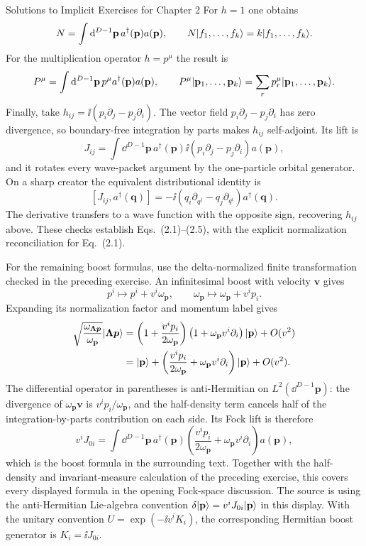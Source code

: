 \begin{bankssolutions}{Solutions to Implicit Exercises for Chapter 2}
For $h=1$ one obtains
\[
  N=\int\mathop{}\!\mathrm{d}^{D-1}\mathbf p\,a^\dagger(\mathbf p)a(\mathbf p),
  \qquad N\lvert f_1,\ldots,f_k\rangle=k\lvert f_1,\ldots,f_k\rangle.
\]
For the multiplication operator $h=p^\mu$ the result is
\[
  P^\mu=\int\mathop{}\!\mathrm{d}^{D-1}\mathbf p\,p^\mu a^\dagger(\mathbf p)a(\mathbf p),
  \qquad P^\mu\lvert \mathbf p_1,\ldots,\mathbf p_k\rangle
  =\sum_r p_r^\mu\lvert \mathbf p_1,\ldots,\mathbf p_k\rangle.
\]
Finally, take $h_{ij}=\ii(p_i\partial_j-p_j\partial_i)$. The vector field
$p_i\partial_j-p_j\partial_i$ has zero divergence, so boundary-free integration
by parts makes $h_{ij}$ self-adjoint. Its lift is
\[
  J_{ij}=\int\dd^{D-1}\mathbf p\,a^\dagger(\mathbf p)
  \ii(p_i\partial_j-p_j\partial_i)a(\mathbf p),
\]
and it rotates every wave-packet argument by the one-particle orbital
generator. On a sharp creator the equivalent distributional identity is
\[
  [J_{ij},a^\dagger(\mathbf q)]
  =-\ii(q_i\partial_{q^j}-q_j\partial_{q^i})a^\dagger(\mathbf q).
\]
The derivative transfers to a wave function with the opposite sign, recovering
$h_{ij}$ above. These checks establish Eqs.~(2.1)--(2.5), with the explicit
normalization reconciliation for Eq.~(2.1).

For the remaining boost formulas, use the delta-normalized finite
transformation checked in the preceding exercise. An infinitesimal boost with
velocity $\mathbf v$ gives
\[
  p^i\longmapsto p^i+v^i\omega_{\mathbf p},
  \qquad
  \omega_{\mathbf p}\longmapsto
  \omega_{\mathbf p}+v^i p_i.
\]
Expanding its normalization factor and momentum label gives
\begin{align*}
  \sqrt{\frac{\omega_{\boldsymbol{\Lambda p}}}{\omega_{\mathbf p}}}
  \lvert \boldsymbol{\Lambda p}\rangle
  &=\left(1+\frac{v^i p_i}{2\omega_{\mathbf p}}\right)
    \left(1+\omega_{\mathbf p}v^i\partial_i\right)\lvert \mathbf p\rangle
    +O(v^2)\\
  &=\lvert \mathbf p\rangle+\left(\frac{v^i p_i}{2\omega_{\mathbf p}}
    +\omega_{\mathbf p}v^i\partial_i\right)\lvert \mathbf p\rangle+O(v^2).
\end{align*}
The differential operator in parentheses is anti-Hermitian on
$L^2(\dd^{D-1}\mathbf p)$: the divergence of $\omega_{\mathbf p}\mathbf v$ is
$v^i p_i/\omega_{\mathbf p}$, and the half-density term cancels half of the
integration-by-parts contribution on each side. Its Fock lift is therefore
\[
  v^i J_{0i}=\int\dd^{D-1}\mathbf p\,a^\dagger(\mathbf p)
  \left(\frac{v^i p_i}{2\omega_{\mathbf p}}
  +\omega_{\mathbf p}v^i\partial_i\right)a(\mathbf p),
\]
which is the boost formula in the surrounding text. Together with the
half-density and invariant-measure calculation of the preceding exercise,
this covers every displayed formula in the opening Fock-space discussion.
The source is using the anti-Hermitian Lie-algebra convention
$\delta\lvert \mathbf p\rangle=v^i J_{0i}\lvert \mathbf p\rangle$ in this display. With the unitary convention
$U=\exp(-\ii v^i K_i)$, the corresponding Hermitian boost generator is
$K_i=\ii J_{0i}$.


\end{bankssolutions}
